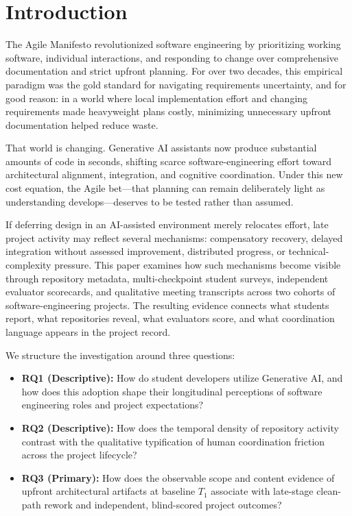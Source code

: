 \section{Introduction}
The Agile Manifesto revolutionized software engineering by prioritizing
working software, individual interactions, and responding to change over
comprehensive documentation and strict upfront planning. For over two decades,
this empirical paradigm was the gold standard for navigating requirements
uncertainty, and for good reason: in a world where local implementation effort
and changing requirements made heavyweight plans costly, minimizing unnecessary
upfront documentation helped reduce waste.

That world is changing. Generative AI assistants now produce substantial
amounts of code in seconds, shifting scarce software-engineering effort toward
architectural alignment, integration, and cognitive coordination. Under this
new cost equation, the Agile bet---that planning can remain deliberately light
as understanding develops---deserves to be tested rather than assumed.

If deferring design in an AI-assisted environment merely relocates effort, late
project activity may reflect several mechanisms: compensatory recovery, delayed
integration without assessed improvement, distributed progress, or
technical-complexity pressure. This paper examines how such mechanisms become
visible through repository metadata, multi-checkpoint student surveys,
independent evaluator scorecards, and qualitative meeting transcripts across
two cohorts of software-engineering projects. The resulting evidence connects
what students report, what repositories reveal, what evaluators score, and what
coordination language appears in the project record.

We structure the investigation around three questions:

\begin{itemize}
	\item \textbf{RQ1 (Descriptive):} How do student developers utilize Generative AI, and how does this adoption shape their longitudinal perceptions of software engineering roles and project expectations?
	\item \textbf{RQ2 (Descriptive):} How does the temporal density of repository activity contrast with the qualitative typification of human coordination friction across the project lifecycle?
	\item \textbf{RQ3 (Primary):} How does the observable scope and content evidence of upfront architectural artifacts at baseline $T_1$ associate with late-stage clean-path rework and independent, blind-scored project outcomes?
\end{itemize}

